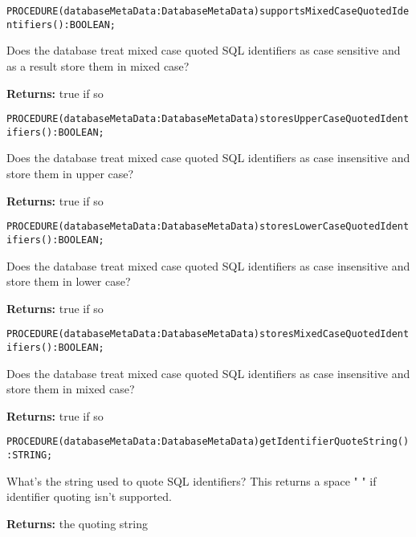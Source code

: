 

\verb'PROCEDURE(databaseMetaData:DatabaseMetaData)supportsMixedCaseQuotedIdentifiers():BOOLEAN;'






Does the database treat mixed case quoted SQL identifiers as case sensitive and as a result store them in mixed case?


{\bf Returns: } 
true if so 




\verb'PROCEDURE(databaseMetaData:DatabaseMetaData)storesUpperCaseQuotedIdentifiers():BOOLEAN;'






Does the database treat mixed case quoted SQL identifiers as case insensitive and store them in upper case? 


{\bf Returns: } 
true if so 




\verb'PROCEDURE(databaseMetaData:DatabaseMetaData)storesLowerCaseQuotedIdentifiers():BOOLEAN;'






Does the database treat mixed case quoted SQL identifiers as case insensitive and store them in lower case? 


{\bf Returns: } 
true if so 




\verb'PROCEDURE(databaseMetaData:DatabaseMetaData)storesMixedCaseQuotedIdentifiers():BOOLEAN;'






Does the database treat mixed case quoted SQL identifiers as case insensitive and store them in mixed case? 


{\bf Returns: } 
true if so 




\verb'PROCEDURE(databaseMetaData:DatabaseMetaData)getIdentifierQuoteString():STRING;'






What's the string used to quote SQL identifiers? This returns a space " " if identifier quoting isn't supported.


{\bf Returns: } 
the quoting string 


